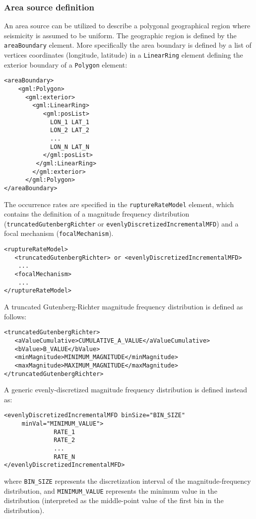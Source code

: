 \subsubsection{Area source definition}
An area source can be utilized to describe a polygonal geographical region where seismicity is assumed to be uniform.
The geographic region is defined by the \Verb+areaBoundary+ element. More specifically the area boundary is defined by a list of vertices coordinates (longitude, latitude) in a \Verb+LinearRing+ element defining the exterior boundary of a \Verb+Polygon+ element:
\begin{Verbatim}[frame=single]
 <areaBoundary>
    <gml:Polygon>
      <gml:exterior>
        <gml:LinearRing>
           <gml:posList>
             LON_1 LAT_1
             LON_2 LAT_2
             ...			
             LON_N LAT_N
           </gml:posList>
         </gml:LinearRing>
        </gml:exterior>
      </gml:Polygon>
</areaBoundary>
\end{Verbatim}
The occurrence rates are specified in the \Verb+ruptureRateModel+ element, which contains the definition of a magnitude frequency distribution (\Verb+truncatedGutenbergRichter+ or \Verb+evenlyDiscretizedIncrementalMFD+) and a focal mechanism (\Verb+focalMechanism+).
\begin{Verbatim}[frame=single]
<ruptureRateModel>
   <truncatedGutenbergRichter> or <evenlyDiscretizedIncrementalMFD>
	...
   <focalMechanism>
	...
</ruptureRateModel>
\end{Verbatim}
A truncated Gutenberg-Richter magnitude frequency distribution is defined as follows:
\begin{Verbatim}[frame=single]
<truncatedGutenbergRichter>
   <aValueCumulative>CUMULATIVE_A_VALUE</aValueCumulative>
   <bValue>B_VALUE</bValue>
   <minMagnitude>MINIMUM_MAGNITUDE</minMagnitude>
   <maxMagnitude>MAXIMUM_MAGNITUDE</maxMagnitude>
</truncatedGutenbergRichter>
\end{Verbatim}
A generic evenly-discretized magnitude frequency distribution is defined instead as:
\begin{Verbatim}[frame=single]
<evenlyDiscretizedIncrementalMFD binSize="BIN_SIZE"
 	 minVal="MINIMUM_VALUE">
              RATE_1
              RATE_2
              ...
              RATE_N
</evenlyDiscretizedIncrementalMFD>
\end{Verbatim}
where \Verb+BIN_SIZE+ represents the discretization interval of the magnitude-frequency distribution, and \Verb+MINIMUM_VALUE+ represents the minimum value in the distribution (interpreted as the middle-point value of the first bin in the distribution).
